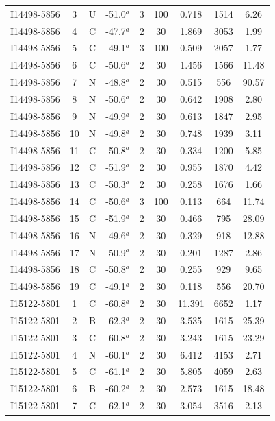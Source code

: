 \begin{table}
\begin{tabular}{ccccccccc}
I14498-5856 & 3 & U & -51.0$^{a}$ & 3 & 100 & 0.718 & 1514 & 6.26 \\
I14498-5856 & 4 & C & -47.7$^{a}$ & 2 & 30 & 1.869 & 3053 & 1.99 \\
I14498-5856 & 5 & C & -49.1$^{a}$ & 3 & 100 & 0.509 & 2057 & 1.77 \\
I14498-5856 & 6 & C & -50.6$^{a}$ & 2 & 30 & 1.456 & 1566 & 11.48 \\
I14498-5856 & 7 & N & -48.8$^{a}$ & 2 & 30 & 0.515 & 556 & 90.57 \\
I14498-5856 & 8 & N & -50.6$^{a}$ & 2 & 30 & 0.642 & 1908 & 2.80 \\
I14498-5856 & 9 & N & -49.9$^{a}$ & 2 & 30 & 0.613 & 1847 & 2.95 \\
I14498-5856 & 10 & N & -49.8$^{a}$ & 2 & 30 & 0.748 & 1939 & 3.11 \\
I14498-5856 & 11 & C & -50.8$^{a}$ & 2 & 30 & 0.334 & 1200 & 5.85 \\
I14498-5856 & 12 & C & -51.9$^{a}$ & 2 & 30 & 0.955 & 1870 & 4.42 \\
I14498-5856 & 13 & C & -50.3$^{a}$ & 2 & 30 & 0.258 & 1676 & 1.66 \\
I14498-5856 & 14 & C & -50.6$^{a}$ & 3 & 100 & 0.113 & 664 & 11.74 \\
I14498-5856 & 15 & C & -51.9$^{a}$ & 2 & 30 & 0.466 & 795 & 28.09 \\
I14498-5856 & 16 & N & -49.6$^{a}$ & 2 & 30 & 0.329 & 918 & 12.88 \\
I14498-5856 & 17 & N & -50.9$^{a}$ & 2 & 30 & 0.201 & 1287 & 2.86 \\
I14498-5856 & 18 & C & -50.8$^{a}$ & 2 & 30 & 0.255 & 929 & 9.65 \\
I14498-5856 & 19 & C & -49.1$^{a}$ & 2 & 30 & 0.118 & 556 & 20.70 \\
I15122-5801 & 1 & C & -60.8$^{a}$ & 2 & 30 & 11.391 & 6652 & 1.17 \\
I15122-5801 & 2 & B & -62.3$^{a}$ & 2 & 30 & 3.535 & 1615 & 25.39 \\
I15122-5801 & 3 & C & -60.8$^{a}$ & 2 & 30 & 3.243 & 1615 & 23.29 \\
I15122-5801 & 4 & N & -60.1$^{a}$ & 2 & 30 & 6.412 & 4153 & 2.71 \\
I15122-5801 & 5 & C & -61.1$^{a}$ & 2 & 30 & 5.805 & 4059 & 2.63 \\
I15122-5801 & 6 & B & -60.2$^{a}$ & 2 & 30 & 2.573 & 1615 & 18.48 \\
I15122-5801 & 7 & C & -62.1$^{a}$ & 2 & 30 & 3.054 & 3516 & 2.13 \\

\end{tabular}
\end{table}
